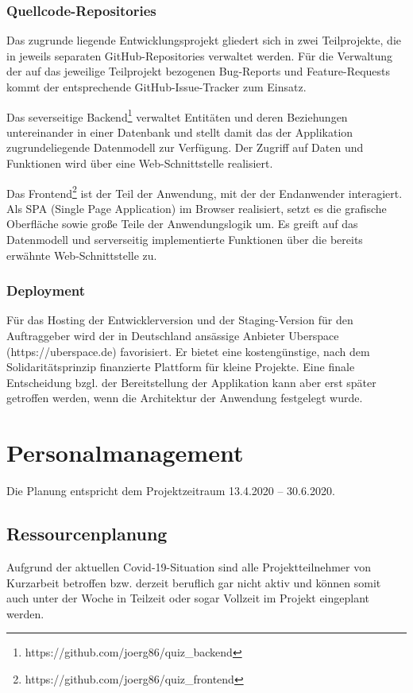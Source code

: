 \documentclass[a4paper,11pt,listof=numbered,glossary=totoc,parskip=half,toc=bib]{scrreprt}
\begin{document}
\subsection{Quellcode-Repositories}

Das zugrunde liegende Entwicklungsprojekt gliedert sich in zwei Teilprojekte, die in jeweils separaten GitHub-Repositories verwaltet werden.
Für die Verwaltung der auf das jeweilige Teilprojekt bezogenen Bug-Reports und Feature-Requests kommt der entsprechende GitHub-Issue-Tracker zum Einsatz.

Das severseitige Backend\footnote{{https://github.com/joerg86/quiz\_{}backend}} verwaltet Entitäten und deren Beziehungen untereinander in einer Datenbank und stellt damit das der Applikation zugrundeliegende Datenmodell zur Verfügung. 
Der Zugriff auf Daten und Funktionen wird über eine Web-Schnittstelle realisiert.

Das Frontend\footnote{https://github.com/joerg86/quiz\_{}frontend} ist der Teil der Anwendung, mit der der Endanwender interagiert. Als SPA (Single Page Application) im Browser realisiert, setzt es die grafische Oberfläche sowie große Teile der Anwendungslogik um.
Es greift auf das Datenmodell und serverseitig implementierte Funktionen über die bereits erwähnte Web-Schnittstelle zu.

\subsection{Deployment}

Für das Hosting der Entwicklerversion und der Staging-Version für den Auftraggeber wird der in Deutschland ansässige Anbieter Uberspace (https://uberspace.de) favorisiert.
Er bietet eine kostengünstige, nach dem Solidaritätsprinzip finanzierte Plattform für kleine Projekte.
Eine finale Entscheidung bzgl. der Bereitstellung der Applikation kann aber erst später getroffen werden, wenn die Architektur der Anwendung festgelegt wurde.
	\newpage
	\chapter{Personalmanagement}

Die Planung entspricht dem Projektzeitraum 13.4.2020 -- 30.6.2020.

\section{Ressourcenplanung}
Aufgrund der aktuellen Covid-19-Situation sind alle Projektteilnehmer von Kurzarbeit betroffen bzw. derzeit beruflich gar nicht aktiv und können somit auch unter der Woche in Teilzeit oder sogar Vollzeit im Projekt eingeplant werden.
\end{document}
